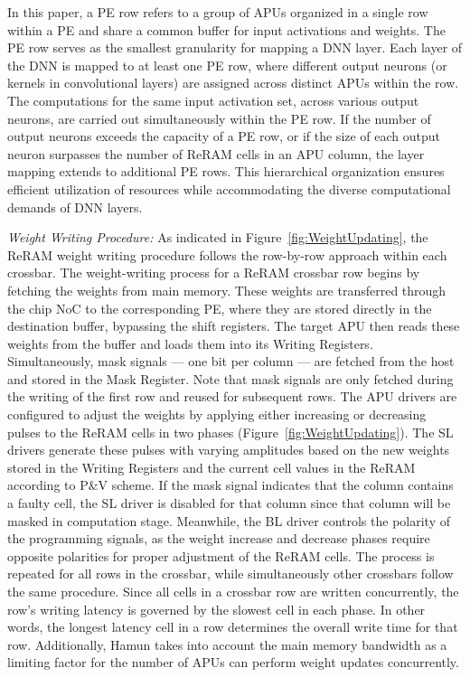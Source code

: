 In this paper, a PE row refers to a group of APUs organized in a single row within a PE and share a common buffer for input activations and weights. The PE row serves as the smallest granularity for mapping a DNN layer. Each layer of the DNN is mapped to at least one PE row, where different output neurons (or kernels in convolutional layers) are assigned across distinct APUs within the row. The computations for the same input activation set, across various output neurons, are carried out simultaneously within the PE row. If the number of output neurons exceeds the capacity of a PE row, or if the size of each output neuron surpasses the number of ReRAM cells in an APU column, the layer mapping extends to additional PE rows. This hierarchical organization ensures efficient utilization of resources while accommodating the diverse computational demands of DNN layers.

\emph{Weight Writing Procedure:} As indicated in Figure~\ref{fig:WeightUpdating}, the ReRAM weight writing procedure follows the row-by-row approach within each crossbar. The weight-writing process for a ReRAM crossbar row begins by fetching the weights from main memory. These weights are transferred through the chip NoC to the corresponding PE, where they are stored directly in the destination buffer, bypassing the shift registers. The target APU then reads these weights from the buffer and loads them into its Writing Registers. Simultaneously, mask signals — one bit per column — are fetched from the host and stored in the Mask Register. Note that mask signals are only fetched during the writing of the first row and reused for subsequent rows. The APU drivers are configured to adjust the weights by applying either increasing or decreasing pulses to the ReRAM cells in two phases (Figure~\ref{fig:WeightUpdating}). The SL drivers generate these pulses with varying amplitudes based on the new weights stored in the Writing Registers and the current cell values in the ReRAM according to P\&V scheme. If the mask signal indicates that the column contains a faulty cell, the SL driver is disabled for that column since that column will be masked in computation stage. Meanwhile, the BL driver controls the polarity of the programming signals, as the weight increase and decrease phases require opposite polarities for proper adjustment of the ReRAM cells. The process is repeated for all rows in the crossbar, while simultaneously other crossbars follow the same procedure. Since all cells in a crossbar row are written concurrently, the row's writing latency is governed by the slowest cell in each phase. In other words, the longest latency cell in a row determines the overall write time for that row. Additionally, Hamun takes into account the main memory bandwidth as a limiting factor for the number of APUs can perform weight updates concurrently.
 
